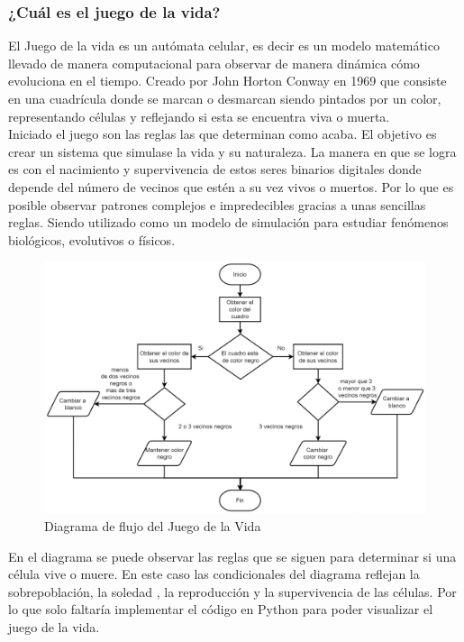 \subsubsection*{¿Cuál es el juego de la vida?}

El Juego de la vida es un autómata celular, es decir es un modelo matemático llevado de 
manera computacional para observar de manera dinámica cómo evoluciona en el tiempo. Creado
por John Horton Conway en 1969 que consiste en una cuadrícula donde se marcan o desmarcan 
siendo pintados por un color, representando células y reflejando si esta se encuentra 
viva o muerta.\\ 


Iniciado el juego son las reglas las que determinan como acaba. El objetivo es crear un 
sistema que simulase la vida y su naturaleza. La manera en que se logra es con el nacimiento 
y supervivencia de estos seres binarios digitales donde depende del número de vecinos que 
estén a su vez vivos o muertos. Por lo que es posible observar patrones complejos e 
impredecibles gracias a unas sencillas reglas. Siendo utilizado como un modelo de simulación 
para estudiar fenómenos biológicos, evolutivos o físicos.

\begin{figure}[H]
    \centering
    \includegraphics[width=0.9\linewidth]{IMA/DiagramaFlujoJuegoLaVida.png} 
    \caption{Diagrama de flujo del Juego de la Vida} 
\end{figure}

En el diagrama se puede observar las reglas que se siguen para determinar si una célula 
vive o muere. En este caso las condicionales del diagrama reflejan la sobrepoblación, la 
soledad , la reproducción y la supervivencia de las células. Por lo que solo faltaría 
implementar el código en Python para poder visualizar el juego de la vida.